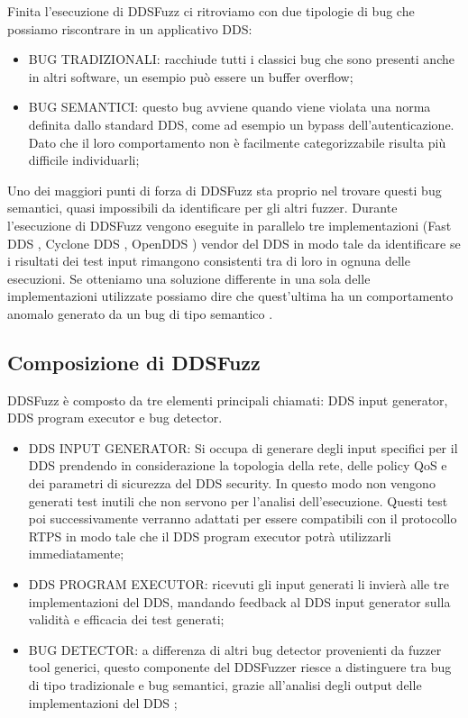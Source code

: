 Finita l'esecuzione di DDSFuzz ci ritroviamo con due tipologie
di bug che possiamo riscontrare in un applicativo DDS:
\begin{itemize}
    \item BUG TRADIZIONALI: racchiude tutti i classici bug 
    che sono presenti anche in altri software, un esempio può 
    essere un buffer overflow;
    \item BUG SEMANTICI: questo bug avviene quando viene violata
    una norma definita dallo standard DDS, come 
    ad esempio un bypass dell'autenticazione. 
    Dato che il loro comportamento
    non è facilmente categorizzabile risulta più difficile individuarli;
\end{itemize}
Uno dei maggiori punti di forza di DDSFuzz sta proprio nel trovare
questi bug semantici, quasi impossibili da identificare per gli altri 
fuzzer. Durante l'esecuzione di DDSFuzz vengono eseguite in parallelo 
tre implementazioni (Fast DDS \cite{FastDDS}, Cyclone DDS \cite{CycloneDDS}, 
OpenDDS \cite{OpenDDS1}) vendor 
del DDS in modo tale da identificare
se i risultati dei test input rimangono consistenti tra di loro in 
ognuna delle esecuzioni. 
Se otteniamo una soluzione differente in una sola 
delle implementazioni utilizzate possiamo dire che quest'ultima ha un 
comportamento anomalo generato da un bug di tipo semantico 
\cite{10.1145/3691620.3695073}. 

\subsection{Composizione di DDSFuzz}
DDSFuzz è composto da tre elementi principali chiamati: 
DDS input generator, DDS program executor e bug detector.
\begin{itemize}
    \item DDS INPUT GENERATOR: Si occupa di generare degli input 
    specifici per il DDS prendendo in considerazione la topologia
    della rete, delle policy QoS e dei parametri di sicurezza del 
    DDS security. In questo modo non vengono generati test inutili 
    che non servono per l'analisi dell'esecuzione. 
    Questi test poi successivamente verranno adattati per essere 
    compatibili con il 
    protocollo RTPS in modo tale che il DDS program executor
    potrà utilizzarli
    immediatamente;
    \item DDS PROGRAM EXECUTOR: ricevuti gli input generati 
    li invierà alle
    tre implementazioni del DDS, mandando feedback  al DDS input generator
    sulla validità e efficacia dei test generati;
    \item BUG DETECTOR: a differenza di altri bug detector provenienti da 
    fuzzer tool generici, questo componente del DDSFuzzer riesce
    a distinguere tra bug 
    di tipo tradizionale e bug semantici, grazie all'analisi
    degli output delle implementazioni del DDS
    \cite{10.1145/3691620.3695073};
\end{itemize}
